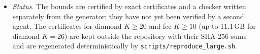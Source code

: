 \documentclass[11pt,a4paper]{report}
\begin{document}
\begin{itemize}
count some non-self-avoiding walks. With optimised children \(n_0\) can be smaller than \(K-1\) (diamond \(K=22\):
19), because the automaton may forget more than necessary when this lowers the weight.
\item \emph{Status.} The bounds are certified by exact certificates and a checker written separately from the
generator; they have not yet been verified by a second agent. The certificates for diamond \(K\ge20\) and fcc
\(K\ge10\) (up to 11.1\,GB for diamond \(K=26\)) are kept outside the repository with their SHA-256 sums and are regenerated
deterministically by \texttt{scripts/reproduce\_large.sh}.
\end{itemize}

\paperreferences
\end{document}
